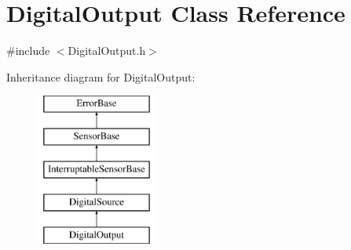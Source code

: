 \hypertarget{classDigitalOutput}{
\section{DigitalOutput Class Reference}
\label{classDigitalOutput}
}


{\ttfamily \#include $<$DigitalOutput.h$>$}

Inheritance diagram for DigitalOutput:\begin{figure}[H]
\begin{center}
\leavevmode
\includegraphics[height=5.000000cm]{classDigitalOutput}
\end{center}
\end{figure}
